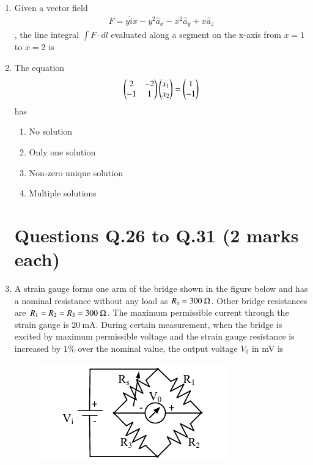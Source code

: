 \documentclass[journal,12pt,onecolumn]{IEEEtran}
\theoremstyle{remark}
\begin{document}
\begin{enumerate}
\item Given a vector field \begin{align*}
    F = y\hat{i}x - y^2 \hat{a}_x - x^2 \hat{a}_y + x \hat{a}_z
\end{align*}
, the line integral $\int F \cdot dl$ evaluated along a segment on the x-axis from $x=1$ to $x=2$ is  

\begin{enumerate}
\end{enumerate}

\item The equation 
\[
\begin{pmatrix}
2 & -2 \\ -1 & 1
\end{pmatrix}
\begin{pmatrix}
x_1 \\ x_2
\end{pmatrix}
=
\begin{pmatrix}
1 \\ -1
\end{pmatrix}
\]
has  

\begin{enumerate}
\item No solution  
\item Only one solution  
\item Non-zero unique solution  
\item Multiple solutions  
\end{enumerate}


\section*{Questions Q.26 to Q.31 (2 marks each)}



\item A strain gauge forms one arm of the bridge shown in the figure below and has a nominal resistance without any load as $R_s=300~\ohm$. Other bridge resistances are 
$R_1 = R_2 = R_3 = 300~\ohm$. The maximum permissible current through the strain gauge is $20~\text{mA}$. During certain measurement, when the bridge is excited by maximum permissible voltage and the strain gauge resistance is increased by $1\%$ over the nominal value, the output voltage $V_0$ in mV is
\begin{figure}[h]
    \centering
    \includegraphics[width=0.5\columnwidth]{figs/9.png}
    \label{fig:placeholder}
\end{figure}
\begin{enumerate}
\begin{multicols}{4}
    


\end{multicols}
\end{enumerate}
\end{enumerate}
\end{document}
